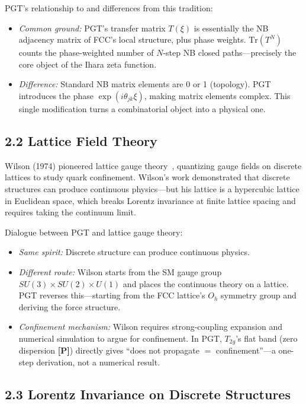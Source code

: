 \documentclass[11pt,a4paper]{article}
\newcommand{\gradeP}{\textbf{[P]}}
\begin{document}
PGT's relationship to and differences from this tradition:
\begin{itemize}[nosep]
\item \emph{Common ground:} PGT's transfer matrix $T(\xi)$ is essentially the NB adjacency matrix of FCC's local structure, plus phase weights. $\mathrm{Tr}(T^N)$ counts the phase-weighted number of $N$-step NB closed paths---precisely the core object of the Ihara zeta function.
\item \emph{Difference:} Standard NB matrix elements are 0 or 1 (topology). PGT introduces the phase $\exp(i\theta_{jk}\xi)$, making matrix elements complex. This single modification turns a combinatorial object into a physical one.
\end{itemize}

\subsection{2.2 Lattice Field Theory}

Wilson (1974) pioneered lattice gauge theory~\cite{wilson}, quantizing gauge fields on discrete lattices to study quark confinement. Wilson's work demonstrated that discrete structures can produce continuous physics---but his lattice is a hypercubic lattice in Euclidean space, which breaks Lorentz invariance at finite lattice spacing and requires taking the continuum limit.

Dialogue between PGT and lattice gauge theory:
\begin{itemize}[nosep]
\item \emph{Same spirit:} Discrete structure can produce continuous physics.
\item \emph{Different route:} Wilson starts from the SM gauge group $SU(3)\times SU(2)\times U(1)$ and places the continuous theory on a lattice. PGT reverses this---starting from the FCC lattice's $O_h$ symmetry group and deriving the force structure.
\item \emph{Confinement mechanism:} Wilson requires strong-coupling expansion and numerical simulation to argue for confinement. In PGT, $T_{2g}$'s flat band (zero dispersion \gradeP) directly gives ``does not propagate $=$ confinement''---a one-step derivation, not a numerical result.
\end{itemize}

\subsection{2.3 Lorentz Invariance on Discrete Structures}
\end{document}

